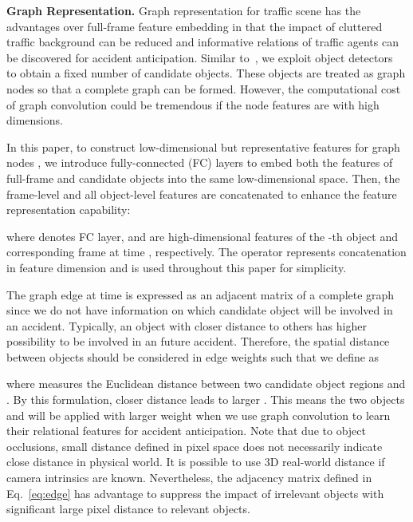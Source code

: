 \documentclass[sigconf]{acmart}
\begin{document}
\textbf{Graph Representation.} Graph representation for traffic scene has the advantages over full-frame feature embedding in that the impact of cluttered traffic background can be reduced and informative relations of traffic agents can be discovered for accident anticipation. Similar to~\cite{ChanACCV2016,ShahT4SW2018}, we exploit object detectors~\cite{RenNIPS2015,CaiCVPR2018} to obtain a fixed number of candidate objects. These objects are treated as graph nodes so that a complete graph can be formed. However, the computational cost of graph convolution could be tremendous if the node features are with high dimensions.

In this paper, to construct low-dimensional but representative features for graph nodes , we introduce fully-connected (FC) layers to embed both the features of full-frame and candidate objects into the same low-dimensional space. Then, the frame-level and all object-level features are concatenated to enhance the feature representation capability:

where  denotes FC layer,  and  are high-dimensional features of the -th object and corresponding frame at time , respectively. The operator  represents concatenation in feature dimension and is used throughout this paper for simplicity.

The graph edge at time  is expressed as an adjacent matrix  of a complete graph since we do not have information on which candidate object will be involved in an accident. Typically, an object with closer distance to others has higher possibility to be involved in an future accident. Therefore, the spatial distance between objects should be considered in edge weights such that we define  as

where  measures the Euclidean distance between two candidate object regions  and . By this formulation, closer distance leads to larger . This means the two objects  and  will be applied with larger weight when we use graph convolution to learn their relational features for accident anticipation. Note that due to object occlusions, small distance defined in pixel space does not necessarily indicate close distance in physical world. It is possible to use 3D real-world distance if camera intrinsics are known. Nevertheless, the adjacency matrix defined in Eq.~\ref{eq:edge} has advantage to suppress the impact of irrelevant objects with significant large pixel distance to relevant objects.
\end{document}
